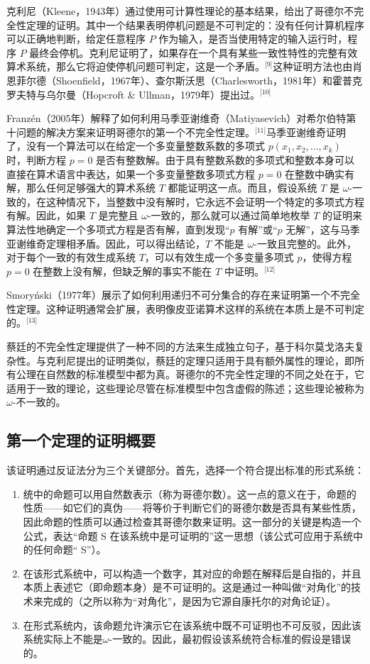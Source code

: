 克利尼（Kleene，1943年）通过使用可计算性理论的基本结果，给出了哥德尔不完全性定理的证明。其中一个结果表明停机问题是不可判定的：没有任何计算机程序可以正确地判断，给定任意程序 \( P \) 作为输入，是否当使用特定的输入运行时，程序 \( P \) 最终会停机。克利尼证明了，如果存在一个具有某些一致性特性的完整有效算术系统，那么它将迫使停机问题可判定，这是一个矛盾。\(^\text{[9]}\)这种证明方法也由肖恩菲尔德（Shoenfield，1967年）、查尔斯沃思（Charlesworth，1981年）和霍普克罗夫特与乌尔曼（Hopcroft & Ullman，1979年）提出过。\(^\text{[10]}\)

Franzén（2005年）解释了如何利用马季亚谢维奇（Matiyasevich）对希尔伯特第十问题的解决方案来证明哥德尔的第一个不完全性定理。\(^\text{[11]}\)马季亚谢维奇证明了，没有一个算法可以在给定一个多变量整数系数的多项式 \( p(x_1, x_2, ..., x_k) \) 时，判断方程 \( p = 0 \) 是否有整数解。由于具有整数系数的多项式和整数本身可以直接在算术语言中表达，如果一个多变量整数多项式方程 \( p = 0 \) 在整数中确实有解，那么任何足够强大的算术系统 \( T \) 都能证明这一点。而且，假设系统 \( T \) 是 \( \omega \)-一致的，在这种情况下，当整数中没有解时，它永远不会证明一个特定的多项式方程有解。因此，如果 \( T \) 是完整且 \( \omega \)-一致的，那么就可以通过简单地枚举 \( T \) 的证明来算法性地确定一个多项式方程是否有解，直到发现“\( p \) 有解”或“\( p \) 无解”，这与马季亚谢维奇定理相矛盾。因此，可以得出结论，\( T \) 不能是 \( \omega \)-一致且完整的。此外，对于每个一致的有效生成系统 \( T \)，可以有效生成一个多变量多项式 \( p \)，使得方程 \( p = 0 \) 在整数上没有解，但缺乏解的事实不能在 \( T \) 中证明。\(^\text{[12]}\)

Smoryński（1977年）展示了如何利用递归不可分集合的存在来证明第一个不完全性定理。这种证明通常会扩展，表明像皮亚诺算术这样的系统在本质上是不可判定的。\(^\text{[13]}\)

蔡廷的不完全性定理提供了一种不同的方法来生成独立句子，基于科尔莫戈洛夫复杂性。与克利尼提出的证明类似，蔡廷的定理只适用于具有额外属性的理论，即所有公理在自然数的标准模型中都为真。哥德尔的不完全性定理的不同之处在于，它适用于一致的理论，这些理论尽管在标准模型中包含虚假的陈述；这些理论被称为\( \omega \)-不一致的。

\subsection{第一个定理的证明概要}  
该证明通过反证法分为三个关键部分。首先，选择一个符合提出标准的形式系统：
\begin{enumerate}
\item 统中的命题可以用自然数表示（称为哥德尔数）。这一点的意义在于，命题的性质——如它们的真伪——将等价于判断它们的哥德尔数是否具有某些性质，因此命题的性质可以通过检查其哥德尔数来证明。这一部分的关键是构造一个公式，表达“命题 S 在该系统中是可证明的”这一思想（该公式可应用于系统中的任何命题“ S”）。
\item 在该形式系统中，可以构造一个数字，其对应的命题在解释后是自指的，并且本质上表述它（即命题本身）是不可证明的。这是通过一种叫做“对角化”的技术来完成的（之所以称为“对角化”，是因为它源自康托尔的对角论证）。
\item 在形式系统内，该命题允许演示它在该系统中既不可证明也不可反驳，因此该系统实际上不能是\( \omega \)-一致的。因此，最初假设该系统符合标准的假设是错误的。
\end{enumerate}
